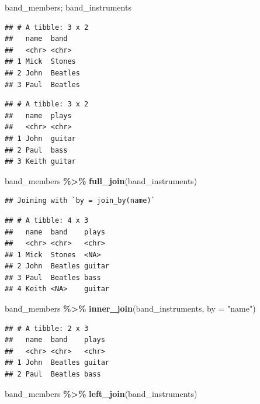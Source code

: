 \documentclass[
]{book}
\newenvironment{Shaded}{\begin{snugshade}}{\end{snugshade}}
\newcommand{\AttributeTok}[1]{\textcolor[rgb]{0.13,0.29,0.53}{#1}}
\newcommand{\FunctionTok}[1]{\textcolor[rgb]{0.13,0.29,0.53}{\textbf{#1}}}
\newcommand{\NormalTok}[1]{#1}
\newcommand{\SpecialCharTok}[1]{\textcolor[rgb]{0.81,0.36,0.00}{\textbf{#1}}}
\newcommand{\StringTok}[1]{\textcolor[rgb]{0.31,0.60,0.02}{#1}}
\begin{document}
\begin{Shaded}
\begin{Highlighting}[]
\NormalTok{band\_members; band\_instruments}
\end{Highlighting}
\end{Shaded}

\begin{verbatim}
## # A tibble: 3 x 2
##   name  band   
##   <chr> <chr>  
## 1 Mick  Stones 
## 2 John  Beatles
## 3 Paul  Beatles
\end{verbatim}

\begin{verbatim}
## # A tibble: 3 x 2
##   name  plays 
##   <chr> <chr> 
## 1 John  guitar
## 2 Paul  bass  
## 3 Keith guitar
\end{verbatim}

\begin{Shaded}
\begin{Highlighting}[]
\NormalTok{band\_members }\SpecialCharTok{\%\textgreater{}\%} \FunctionTok{full\_join}\NormalTok{(band\_instruments)}
\end{Highlighting}
\end{Shaded}

\begin{verbatim}
## Joining with `by = join_by(name)`
\end{verbatim}

\begin{verbatim}
## # A tibble: 4 x 3
##   name  band    plays 
##   <chr> <chr>   <chr> 
## 1 Mick  Stones  <NA>  
## 2 John  Beatles guitar
## 3 Paul  Beatles bass  
## 4 Keith <NA>    guitar
\end{verbatim}

\begin{Shaded}
\begin{Highlighting}[]
\NormalTok{band\_members }\SpecialCharTok{\%\textgreater{}\%} \FunctionTok{inner\_join}\NormalTok{(band\_instruments, }\AttributeTok{by =} \StringTok{"name"}\NormalTok{)}
\end{Highlighting}
\end{Shaded}

\begin{verbatim}
## # A tibble: 2 x 3
##   name  band    plays 
##   <chr> <chr>   <chr> 
## 1 John  Beatles guitar
## 2 Paul  Beatles bass
\end{verbatim}

\begin{Shaded}
\begin{Highlighting}[]
\NormalTok{band\_members }\SpecialCharTok{\%\textgreater{}\%} \FunctionTok{left\_join}\NormalTok{(band\_instruments)}
\end{Highlighting}
\end{Shaded}
\end{document}
